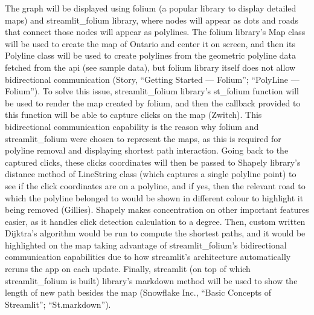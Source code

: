 \documentclass[fontsize=11pt]{article}
\begin{document}
The graph will be displayed using folium (a popular library to display detailed maps) and streamlit\_folium library, where nodes will appear as dots and roads that connect those nodes will appear as polylines. The folium library's Map class will be used to create the map of Ontario and center it on screen, and then its Polyline class will be used to create polylines from the geometric polyline data fetched from the api (see sample data), but folium library itself does not allow bidirectional communication (Story, “Getting Started — Folium”; “PolyLine — Folium”). To solve this issue, streamlit\_folium library's st\_folium function will be used to render the map created by folium, and then the callback provided to this function will be able to capture clicks on the map (Zwitch). This bidirectional communication capability is the reason why folium and streamlit\_folium were chosen to represent the maps, as this is required for polyline removal and displaying shortest path interaction. Going back to the captured clicks, these clicks coordinates will then be passed to Shapely library's distance method of LineString class (which captures a single polyline point) to see if the click coordinates are on a polyline, and if yes, then the relevant road to which the polyline belonged to would be shown in different colour to highlight it being removed (Gillies). Shapely makes concentration on other important features easier, as it handles click detection calculation to a degree. Then, custom written Dijktra's algorithm would be run to compute the shortest paths, and it would be highlighted on the map taking advantage of streamlit\_folium's bidirectional communication capabilities due to how streamlit's architecture automatically reruns the app on each update. Finally, streamlit (on top of which streamlit\_folium is built) library's markdown method will be used to show the length of new path besides the map (Snowflake Inc., “Basic Concepts of Streamlit”; “St.markdown”).
\end{document}
